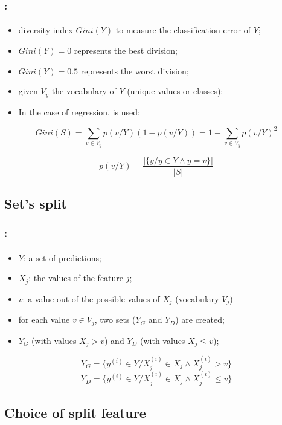 \documentclass[xcolor=table]{beamer}
\begin{document}
\begin{frame}
	\frametitle{\insertshortsubtitle: \insertsection}
	\framesubtitle{\insertsubsection}
	
	\begin{itemize}
		\item diversity index $Gini(Y)$ to measure the classification error of $Y$;
		\item $Gini(Y)=0$ represents the best division;
		\item $Gini(Y)=0.5$ represents the worst division;
		\item given $V_y$ the vocabulary of $Y$ (unique values or classes);
		\item In the case of regression,  is used;
	\end{itemize}
	
	\[Gini(S) = \sum\limits_{v \in V_y} p(v/Y) (1-p(v/Y)) = 1 - \sum\limits_{v \in V_y} p(v/Y)^2 \]
	
	\[p(v/Y) = \frac{|\{y / y \in Y \wedge y = v\}|}{|S|}\]
	
\end{frame}

\subsection{Set's split}

\begin{frame}
	\frametitle{\insertshortsubtitle: \insertsection}
	\framesubtitle{\insertsubsection}
	
	\begin{itemize}
		\item $Y$: a set of predictions;
		\item $X_j$: the values of the feature $j$;
		\item $v$: a value out of the possible values of $X_j$ (vocabulary $V_j$)
		\item for each value $v \in V_j$, two sets ($Y_G$ and $Y_D$) are created;
		\item $Y_G$ (with values $X_j > v$) and $Y_D$ (with values $X_j \le v$);
	\end{itemize}
	
	\[Y_G = \{y^{(i)} \in Y / X_j^{(i)} \in X_j \wedge X_j^{(i)} > v\}\]
	\[Y_D = \{y^{(i)} \in Y / X_j^{(i)} \in X_j \wedge X_j^{(i)} \le v\}\]
	
\end{frame}

\subsection{Choice of split feature}
\end{document}

